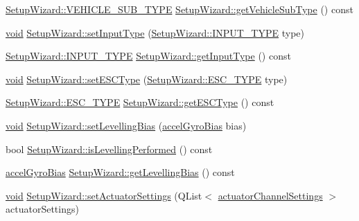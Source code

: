 \begin{DoxyCompactItemize}
\item 
\hyperlink{group___vehicle_configuration_source_gaa22bfa88d750f2b46f66702a723e8342}{\-Setup\-Wizard\-::\-V\-E\-H\-I\-C\-L\-E\-\_\-\-S\-U\-B\-\_\-\-T\-Y\-P\-E} \hyperlink{group___setup_ga4ad46c232d39b8e7a4371a812c48e761}{\-Setup\-Wizard\-::get\-Vehicle\-Sub\-Type} () const 
\item 
\hyperlink{group___u_a_v_objects_plugin_ga444cf2ff3f0ecbe028adce838d373f5c}{void} \hyperlink{group___setup_gaad34b14bbd332f721c9bca49fc43bf33}{\-Setup\-Wizard\-::set\-Input\-Type} (\hyperlink{group___vehicle_configuration_source_gae10edd59d3a32fad8c531a1d2346115c}{\-Setup\-Wizard\-::\-I\-N\-P\-U\-T\-\_\-\-T\-Y\-P\-E} type)
\item 
\hyperlink{group___vehicle_configuration_source_gae10edd59d3a32fad8c531a1d2346115c}{\-Setup\-Wizard\-::\-I\-N\-P\-U\-T\-\_\-\-T\-Y\-P\-E} \hyperlink{group___setup_ga8457ec450095eb7b93fd74be5451cac6}{\-Setup\-Wizard\-::get\-Input\-Type} () const 
\item 
\hyperlink{group___u_a_v_objects_plugin_ga444cf2ff3f0ecbe028adce838d373f5c}{void} \hyperlink{group___setup_ga08e01090d6c906ff75ee8d840bbd9862}{\-Setup\-Wizard\-::set\-E\-S\-C\-Type} (\hyperlink{group___vehicle_configuration_source_ga734c812e17554d4f7ca67f1008abdd6c}{\-Setup\-Wizard\-::\-E\-S\-C\-\_\-\-T\-Y\-P\-E} type)
\item 
\hyperlink{group___vehicle_configuration_source_ga734c812e17554d4f7ca67f1008abdd6c}{\-Setup\-Wizard\-::\-E\-S\-C\-\_\-\-T\-Y\-P\-E} \hyperlink{group___setup_ga3922ac6f628847018f045d0c60f1ba6b}{\-Setup\-Wizard\-::get\-E\-S\-C\-Type} () const 
\item 
\hyperlink{group___u_a_v_objects_plugin_ga444cf2ff3f0ecbe028adce838d373f5c}{void} \hyperlink{group___setup_ga04cbfb7730776465a95c22950d048556}{\-Setup\-Wizard\-::set\-Levelling\-Bias} (\hyperlink{structaccel_gyro_bias}{accel\-Gyro\-Bias} bias)
\item 
bool \hyperlink{group___setup_ga71069ce8994f32f192e40aaa45b51a4a}{\-Setup\-Wizard\-::is\-Levelling\-Performed} () const 
\item 
\hyperlink{structaccel_gyro_bias}{accel\-Gyro\-Bias} \hyperlink{group___setup_ga2e280373fdc65c0cb8c5520855eadbef}{\-Setup\-Wizard\-::get\-Levelling\-Bias} () const 
\item 
\hyperlink{group___u_a_v_objects_plugin_ga444cf2ff3f0ecbe028adce838d373f5c}{void} \hyperlink{group___setup_gadf481b176ca83f64ec53b8479220abec}{\-Setup\-Wizard\-::set\-Actuator\-Settings} (\-Q\-List$<$ \hyperlink{structactuator_channel_settings}{actuator\-Channel\-Settings} $>$ actuator\-Settings)

\end{DoxyCompactItemize}

